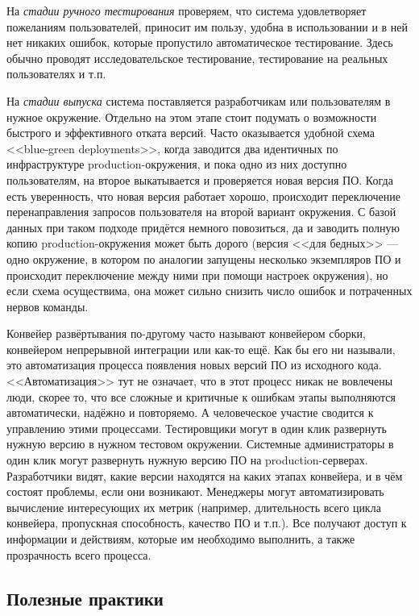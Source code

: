 \documentclass{../../text-style}
\begin{document}
На \emph{стадии ручного тестирования} проверяем, что система удовлетворяет пожеланиям пользователей, приносит им пользу, удобна в использовании и в ней нет никаких ошибок, которые пропустило автоматическое тестирование. Здесь обычно проводят исследовательское тестирование, тестирование на реальных пользователях и т.п.

На \emph{стадии выпуска} система поставляется разработчикам или пользователям в нужное окружение. Отдельно на этом этапе стоит подумать о возможности быстрого и эффективного отката версий. Часто оказывается удобной схема <<blue-green deployments>>, когда заводится два идентичных по инфраструктуре production-окружения, и пока одно из них доступно пользователям, на второе выкатывается и проверяется новая версия ПО. Когда есть уверенность, что новая версия работает хорошо, происходит переключение перенаправления запросов пользователя на второй вариант окружения. С базой данных при таком подходе придётся немного повозиться, да и заводить полную копию production-окружения может быть дорого (версия <<для бедных>> --- одно окружение, в котором по аналогии запущены несколько экземпляров ПО и происходит переключение между ними при помощи настроек окружения), но если схема осуществима, она может сильно снизить число ошибок и потраченных нервов команды.

Конвейер развёртывания по-другому часто называют конвейером сборки, конвейером непрерывной интеграции или как-то ещё. Как бы его ни называли, это автоматизация процесса появления новых версий ПО из исходного кода. <<Автоматизация>> тут не означает, что в этот процесс никак не вовлечены люди, скорее то, что все сложные и критичные к ошибкам этапы выполняются автоматически, надёжно и повторяемо. А человеческое участие сводится к управлению этими процессами. Тестировщики могут в один клик развернуть нужную версию в нужном тестовом окружении. Системные администраторы в один клик могут развернуть нужную версию ПО на production-серверах. Разработчики видят, какие версии находятся на каких этапах конвейера, и в чём состоят проблемы, если они возникают. Менеджеры могут автоматизировать вычисление интересующих их метрик (например, длительность всего цикла конвейера, пропускная способность, качество ПО и т.п.). Все получают доступ к информации и действиям, которые им необходимо выполнить, а также прозрачность всего процесса.

\subsection{Полезные практики}
\end{document}
